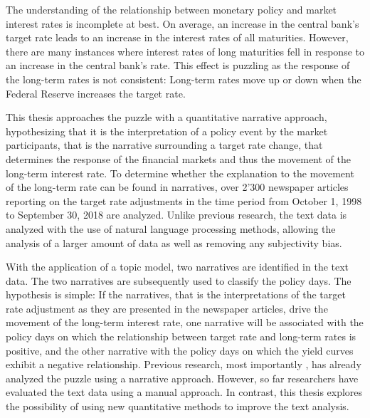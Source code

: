 \documentclass[11pt,a4paper,english,oneside]{book}
\numberwithin{equation}{chapter}
\begin{document}
The understanding of the relationship between monetary policy and market interest rates is incomplete at best. On average, an increase in the central bank's target rate leads to an increase in the interest rates of all maturities. However, there are many instances where interest rates of long maturities fell in response to an increase in the central bank's rate. This effect is puzzling as the response of the long-term rates is not consistent: Long-term rates move up or down when the Federal Reserve increases the target rate.

This thesis approaches the puzzle with a quantitative narrative approach, hypothesizing that it is the interpretation of a policy event by the market participants, that is the narrative surrounding a target rate change, that determines the response of the financial markets and thus the movement of the long-term interest rate. To determine whether the explanation to the movement of the long-term rate can be found in narratives, over 2'300 newspaper articles reporting on the target rate adjustments in the time period from October 1, 1998 to September 30, 2018 are analyzed. Unlike previous research, the text data is analyzed with the use of natural language processing methods, allowing the analysis of a larger amount of data as well as removing any subjectivity bias. 

With the application of a topic model, two narratives are identified in the text data. The two narratives are subsequently used to classify the policy days. The hypothesis is simple: If the narratives, that is the interpretations of the target rate adjustment as they are presented in the newspaper articles, drive the movement of the long-term interest rate, one narrative will be associated with the policy days on which the relationship between target rate and long-term rates is positive, and the other narrative with the policy days on which the yield curves exhibit a negative relationship. Previous research, most importantly \citet{Ellingsen.2003}, has already analyzed the puzzle using a narrative approach. However, so far researchers have evaluated the text data using a manual approach. In contrast, this thesis explores the possibility of using new quantitative methods to improve the text analysis. 
\end{document}

